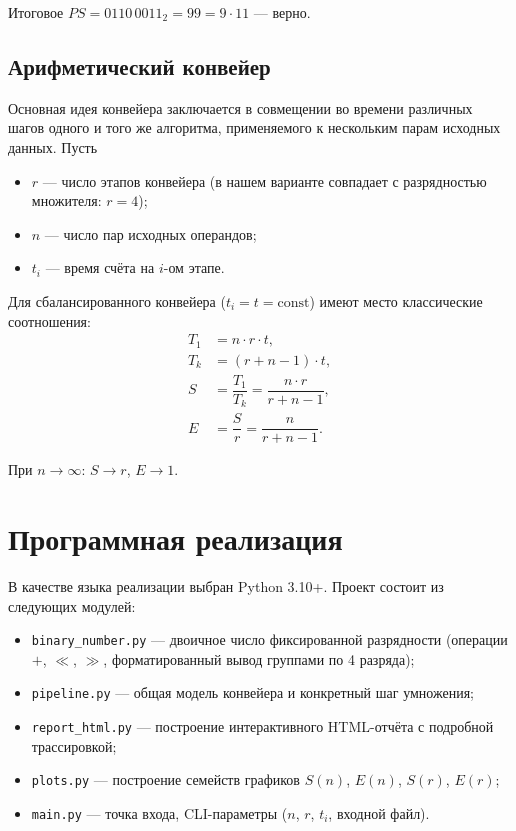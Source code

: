 \documentclass[12pt,a4paper]{article}
\begin{document}
\noindent Итоговое $PS = 0110\,0011_2 = 99 = 9 \cdot 11$ — верно.

\subsection{Арифметический конвейер}

Основная идея конвейера заключается в совмещении во времени
различных шагов одного и того же алгоритма, применяемого
к нескольким парам исходных данных. Пусть
\begin{itemize}[leftmargin=*,itemsep=2pt]
  \item $r$ — число этапов конвейера (в нашем варианте совпадает
        с разрядностью множителя: $r = 4$);
  \item $n$ — число пар исходных операндов;
  \item $t_i$ — время счёта на $i$-ом этапе.
\end{itemize}
Для сбалансированного конвейера ($t_i = t = \text{const}$) имеют место
классические соотношения:
\begin{align}
  T_1 &= n \cdot r \cdot t,             \label{eq:T1}\\
  T_k &= (r + n - 1) \cdot t,           \label{eq:Tk}\\
  S   &= \dfrac{T_1}{T_k} = \dfrac{n \cdot r}{r + n - 1}, \label{eq:S}\\[6pt]
  E   &= \dfrac{S}{r}      = \dfrac{n}{r + n - 1}.       \label{eq:E}
\end{align}

При $n \to \infty$: $S \to r$, $E \to 1$.

\section{Программная реализация}

В качестве языка реализации выбран Python 3.10+.
Проект состоит из следующих модулей:

\begin{itemize}[leftmargin=*,itemsep=2pt]
  \item \texttt{binary\_number.py} — двоичное число фиксированной
        разрядности (операции $+$, $\ll$, $\gg$, форматированный
        вывод группами по 4 разряда);
  \item \texttt{pipeline.py} — общая модель конвейера и конкретный
        шаг умножения;
  \item \texttt{report\_html.py} — построение интерактивного
        HTML-отчёта с подробной трассировкой;
  \item \texttt{plots.py} — построение семейств графиков $S(n)$,
        $E(n)$, $S(r)$, $E(r)$;
  \item \texttt{main.py} — точка входа, CLI-параметры
        ($n$, $r$, $t_i$, входной файл).
\end{itemize}
\end{document}
